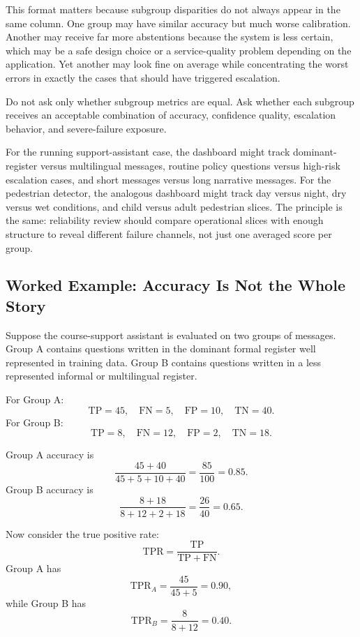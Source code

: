 This format matters because subgroup disparities do not always appear in the same column. One group may have similar accuracy but much worse calibration. Another may receive far more abstentions because the system is less certain, which may be a safe design choice or a service-quality problem depending on the application. Yet another may look fine on average while concentrating the worst errors in exactly the cases that should have triggered escalation.

\begin{decisionbox}
Do not ask only whether subgroup metrics are equal. Ask whether each subgroup receives an acceptable combination of accuracy, confidence quality, escalation behavior, and severe-failure exposure.
\end{decisionbox}

For the running support-assistant case, the dashboard might track dominant-register versus multilingual messages, routine policy questions versus high-risk escalation cases, and short messages versus long narrative messages. For the pedestrian detector, the analogous dashboard might track day versus night, dry versus wet conditions, and child versus adult pedestrian slices. The principle is the same: reliability review should compare operational slices with enough structure to reveal different failure channels, not just one averaged score per group.

\subsection{Worked Example: Accuracy Is Not the Whole Story}

Suppose the course-support assistant is evaluated on two groups of messages. Group A contains questions written in the dominant formal register well represented in training data. Group B contains questions written in a less represented informal or multilingual register.

For Group A:
\[
\text{TP}=45,\quad \text{FN}=5,\quad \text{FP}=10,\quad \text{TN}=40.
\]
For Group B:
\[
\text{TP}=8,\quad \text{FN}=12,\quad \text{FP}=2,\quad \text{TN}=18.
\]

Group A accuracy is
\[
\frac{45 + 40}{45 + 5 + 10 + 40} = \frac{85}{100} = 0.85.
\]
Group B accuracy is
\[
\frac{8 + 18}{8 + 12 + 2 + 18} = \frac{26}{40} = 0.65.
\]

Now consider the true positive rate:
\[
\mathrm{TPR} = \frac{\mathrm{TP}}{\mathrm{TP}+\mathrm{FN}}.
\]
Group A has
\[
\mathrm{TPR}_A = \frac{45}{45+5} = 0.90,
\]
while Group B has
\[
\mathrm{TPR}_B = \frac{8}{8+12} = 0.40.
\]

